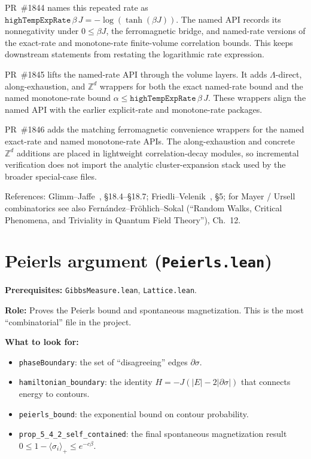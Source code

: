 \documentclass[a4paper,11pt]{article}
\begin{document}
PR~\#1844 names this repeated rate as
\(\texttt{highTempExpRate}\,\beta\,J = -\log(\tanh(\beta J))\).  The
named API records its nonnegativity under \(0 \le \beta J\), the
ferromagnetic bridge, and named-rate versions of the exact-rate and
monotone-rate finite-volume correlation bounds.  This keeps downstream
statements from restating the logarithmic rate expression.

PR~\#1845 lifts the named-rate API through the volume layers.  It adds
\(\Lambda\)-direct, along-exhaustion, and \(\mathbb{Z}^d\) wrappers for
both the exact named-rate bound and the named monotone-rate bound
\(\alpha \le \texttt{highTempExpRate}\,\beta\,J\).  These wrappers align
the named API with the earlier explicit-rate and monotone-rate packages.

PR~\#1846 adds the matching ferromagnetic convenience wrappers for the
named exact-rate and named monotone-rate APIs.  The along-exhaustion and
concrete \(\mathbb{Z}^d\) additions are placed in lightweight
correlation-decay modules, so incremental verification does not import
the analytic cluster-expansion stack used by the broader special-case
files.

References: Glimm--Jaffe~\cite{glimm-jaffe}, \S18.4--\S18.7;
Friedli--Velenik~\cite{friedli-velenik}, \S5; for Mayer / Ursell
combinatorics see also Fern\'andez--Fr\"ohlich--Sokal
(``Random Walks, Critical Phenomena, and Triviality in Quantum
Field Theory''), Ch.~12.

\section{Peierls argument (\texttt{Peierls.lean})}

\par\noindent\textbf{Prerequisites:} \texttt{GibbsMeasure.lean},
\texttt{Lattice.lean}.

\textbf{Role:} Proves the Peierls bound and spontaneous magnetization.
This is the most ``combinatorial'' file in the project.

\textbf{What to look for:}
\begin{itemize}
  \item \texttt{phaseBoundary}: the set of ``disagreeing'' edges
    $\partial\sigma$.
  \item \texttt{hamiltonian\_boundary}: the identity
    $H = -J(|E| - 2|\partial\sigma|)$ that connects energy to contours.
  \item \texttt{peierls\_bound}: the exponential bound on contour
    probability.
  \item \texttt{prop\_5\_4\_2\_self\_contained}: the final spontaneous
    magnetization result $0 \le 1 - \langle\sigma_i\rangle_+ \le e^{-c\beta}$.
\end{itemize}
\end{document}
